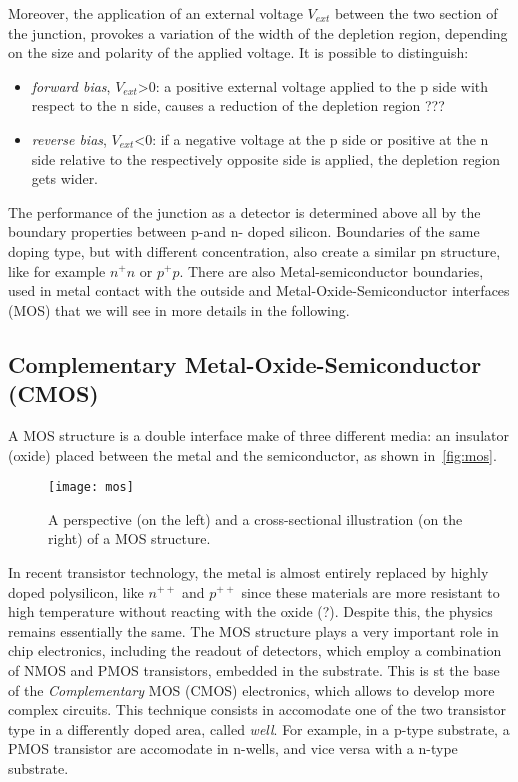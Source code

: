 Moreover, the application of an external voltage $V_{ext}$ between the two section of the junction, provokes a variation of the width of the depletion region, depending on the size and polarity of the applied voltage. It is possible to distinguish:

\begin{itemize}
\item \emph{forward bias}, $V_{ext}$>0: a positive external voltage applied to the p side with respect to the n side, causes a reduction of the depletion region ???
\item \emph{reverse bias}, $V_{ext}$<0: if a negative voltage at the p side or positive at the n side relative to the respectively opposite side is applied, the depletion region gets wider.
\end{itemize}

The performance of the junction as a detector is determined above all by the boundary properties between p-and n- doped silicon. Boundaries of the same doping type, but with different concentration, also create a similar pn structure, like for example $n^{+}n$ or $p^{+}p$. There are also Metal-semiconductor boundaries, used in metal contact with the outside and Metal-Oxide-Semiconductor interfaces (MOS) that we will see in more details in the following.
 
\subsection{Complementary Metal-Oxide-Semiconductor (CMOS)}

A MOS structure is a double interface make of three different media: an insulator (oxide) placed between the metal and the semiconductor, as shown in~\autoref{fig:mos}.

\begin{figure}[h!]
\centering
\texttt{[image: mos]}
\caption{A perspective (on the left) and a cross-sectional illustration (on the right) of a MOS structure.}
\label{fig:mos}
\end{figure}

In recent transistor technology, the metal is almost entirely replaced by highly doped polysilicon, like $n^{++}$ and $p^{++}$ since these materials are more resistant to high temperature without reacting with the oxide (?). Despite this, the physics remains essentially the same. 
The MOS structure plays a very important role in chip electronics, including the readout of detectors, which employ a combination of NMOS and PMOS transistors, embedded in the substrate. This is st the base of the \emph{Complementary} MOS (CMOS) electronics, which allows to develop more complex circuits. This technique consists in accomodate one of the two transistor type in a differently doped area, called \emph{well}. For example,  in a p-type substrate, a PMOS transistor are accomodate in n-wells, and vice versa with a n-type substrate. 


